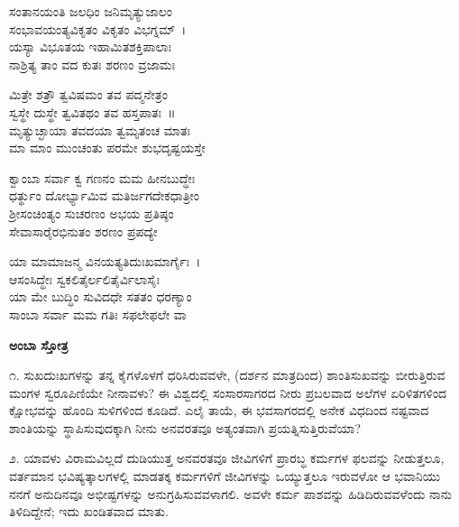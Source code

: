 
\begin{myquote}
ಸಂತಾನಯಂತಿ ಜಲಧಿಂ ಜನಿಮೃತ್ಯುಜಾಲಂ\\ಸಂಭಾವಯಂತ್ಯವಿಕೃತಂ ವಿಕೃತಂ ವಿಭಗ್ನಮ್~।\\
ಯಸ್ಯಾ ವಿಭೂತಯ ಇಹಾಮಿತಶಕ್ತಿಪಾಲಾಃ\\ನಾಶ್ರಿತ್ಯ ತಾಂ ವದ ಕುತಃ ಶರಣಂ ವ್ರಜಾಮಃ
\end{myquote}


\begin{myquote}
ಮಿತ್ರೇ ಶತ್ರೌ ತ್ವವಿಷಮಂ ತವ ಪದ್ಮನೇತ್ರಂ\\ಸ್ವಸ್ಥೇ ದುಸ್ಥೇ ತ್ವವಿತಥಂ ತವ ಹಸ್ತಪಾತಃ~॥\\ಮೃತ್ಯುಚ್ಛಾಯಾ ತವದಯಾ ತ್ವಮೃತಂಚ ಮಾತಃ\\ಮಾ ಮಾಂ ಮುಂಚಂತು ಪರಮೇ ಶುಭದೃಷ್ಟಯಸ್ತೇ
\end{myquote}


\begin{myquote}
ಕ್ವಾಂಬಾ ಸರ್ವಾ ಕ್ವ ಗಣನಂ ಮಮ ಹೀನಬುದ್ಧೇಃ\\ಧರ್ತ್ಥುಂ ದೋರ್ಭ್ಯಾಮಿವ ಮತಿರ್ಜಗದೇಕಧಾತ್ರೀಂ\\ಶ‍್ರೀಸಂಚಿಂತ್ಯಂ ಸುಚರಣಂ ಅಭಯ ಪ್ರತಿಷ್ಠಂ\\ಸೇವಾಸಾರೈರಭಿನುತಂ ಶರಣಂ ಪ್ರಪದ್ಯೇ
\end{myquote}


\begin{myquote}
ಯಾ ಮಾಮಾಜನ್ಮ ವಿನಯತ್ಯತಿದುಃಖಮಾರ್ಗೈಃ~।\\
ಆಸಂಸಿದ್ಧೇಃ ಸ್ವಕಲಿತೈರ್ಲಲಿತೈರ್ವಿಲಾಸೈಃ\\ಯಾ ಮೇ ಬುದ್ಧಿಂ ಸುವಿದಧೇ ಸತತಂ ಧರಣ್ಯಾಂ\\ಸಾಂಬಾ ಸರ್ವಾ ಮಮ ಗತಿಃ ಸಫಲೇಫಲೇ ವಾ
\end{myquote}


\begin{center}
\textbf{ಅಂಬಾ ಸ್ತೋತ್ರ}
\end{center}

೧. ಸುಖದುಃಖಗಳನ್ನು ತನ್ನ ಕೈಗಳೊಳಗೆ ಧರಿಸಿರುವವಳೇ, (ದರ್ಶನ ಮಾತ್ರದಿಂದ) ಶಾಂತಿಸುಖವನ್ನು ಬೀರುತ್ತಿರುವ ಮಂಗಳ ಸ್ವರೂಪಿಣಿಯೇ ನೀನಾವಳು? ಈ ವಿಶ್ವದಲ್ಲಿ ಸಂಸಾರಸಾಗರದ ನೀರು ಪ್ರಬಲವಾದ ಅಲೆಗಳ ಏರಿಳಿತಗಳಿಂದ ಕ್ಷೋಭವನ್ನು ಹೊಂದಿ ಸುಳಿಗಳಿಂದ ಕೂಡಿದೆ. ಎಲೈ ತಾಯೆ, ಈ ಭವಸಾಗರದಲ್ಲಿ ಅನೇಕ ವಿಧದಿಂದ ನಷ್ಟವಾದ ಶಾಂತಿಯನ್ನು ಸ್ಥಾಪಿಸುವುದಕ್ಕಾಗಿ ನೀನು ಅನವರತವೂ ಅತ್ಯಂತವಾಗಿ ಪ್ರಯತ್ನಿಸುತ್ತಿರುವೆಯಾ?

೨. ಯಾವಳು ವಿರಾಮವಿಲ್ಲದೆ ದುಡಿಯುತ್ತ ಅನವರತವೂ ಜೀವಿಗಳಿಗೆ ಪ್ರಾರಬ್ಧ ಕರ್ಮಗಳ ಫಲವನ್ನು ನೀಡುತ್ತಲೂ, ವರ್ತಮಾನ ಭವಿಷ್ಯತ್ಕಾಲಗಳಲ್ಲಿ ಮಾಡತಕ್ಕ ಕರ್ಮಗಳಿಗೆ ಜೀವಿಗಳನ್ನು ಒಯ್ಯುತ್ತಲೂ ಇರುವಳೋ ಆ ಭವಾನಿಯು ನನಗೆ ಅನುದಿನವೂ ಅಭೀಷ್ಟಗಳನ್ನು ಅನುಗ್ರಹಿಸುವವಳಾಗಲಿ. ಅವಳೇ ಕರ್ಮ ಪಾಶವನ್ನು ಹಿಡಿದಿರುವವಳೆಂದು ನಾನು ತಿಳಿದಿದ್ದೇನೆ; ಇದು ಖಂಡಿತವಾದ ಮಾತು.

